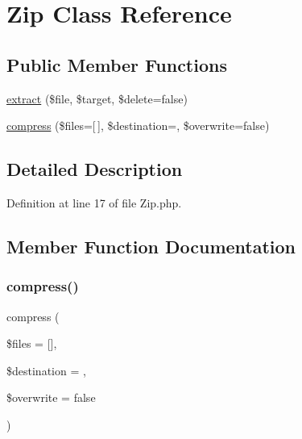 \hypertarget{class_zest_1_1_zip_1_1_zip}{}\section{Zip Class Reference}
\label{class_zest_1_1_zip_1_1_zip}
\subsection*{Public Member Functions}
\begin{DoxyCompactItemize}
\item 
\mbox{\hyperlink{class_zest_1_1_zip_1_1_zip_a84d25d2e4048fa91d6c90f7ae44bd302}{extract}} (\$file, \$target, \$delete=false)
\item 
\mbox{\hyperlink{class_zest_1_1_zip_1_1_zip_ac890ed470ba6fdc78bd89532ade1535f}{compress}} (\$files=\mbox{[}$\,$\mbox{]}, \$destination=\textquotesingle{}\textquotesingle{}, \$overwrite=false)
\end{DoxyCompactItemize}


\subsection{Detailed Description}


Definition at line 17 of file Zip.\+php.



\subsection{Member Function Documentation}
\mbox{\label{class_zest_1_1_zip_1_1_zip_ac890ed470ba6fdc78bd89532ade1535f}} 
\subsubsection{\texorpdfstring{compress()}{compress()}}
{\footnotesize\ttfamily compress (\begin{DoxyParamCaption}\item[{}]{\$files = {\ttfamily \mbox{[}\mbox{]}},  }\item[{}]{\$destination = {\ttfamily \textquotesingle{}\textquotesingle{}},  }\item[{}]{\$overwrite = {\ttfamily false} }\end{DoxyParamCaption})}

